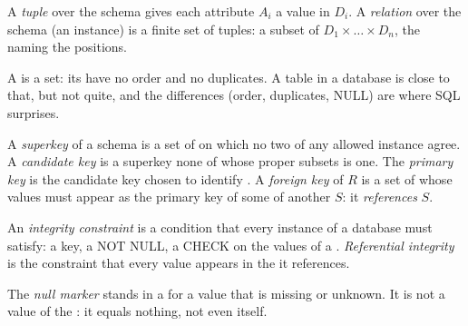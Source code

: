 \begin{definition}\label{def:b1:relational-model:relation}
A \emph{tuple} over the schema gives each attribute $A_i$ a value in $D_i$. A
\emph{relation} over the schema (an instance) is a finite set of tuples: a subset of $D_1
\times \dots \times D_n$, the  naming the positions.
\end{definition}

A  is a set: its  have no order and no duplicates. A table in a database is close to that, but not quite,
and the differences (order, duplicates, NULL) are where SQL surprises.

\begin{definition}\label{def:b1:relational-model:keys}
A \emph{superkey} of a schema is a set of  on which no two  of any allowed instance
agree. A \emph{candidate key} is a superkey none of whose proper subsets is one. The \emph{primary
key} is the candidate key chosen to identify . A \emph{foreign key} of $R$ is a
set of  whose values must appear as the primary key of some  of another  $S$: it
\emph{references} $S$.
\end{definition}

\begin{definition}\label{def:b1:relational-model:integrity}
An \emph{integrity constraint} is a condition that every instance of a database must satisfy:
a key, a NOT NULL, a CHECK on the values of a . \emph{Referential integrity} is the
constraint that every  value appears in the  it references.
\end{definition}

\begin{definition}\label{def:b1:relational-model:null}
The \emph{null marker}  stands in a  for a value that is missing or unknown. It is not a
value of the : it equals nothing, not even itself.
\end{definition}

